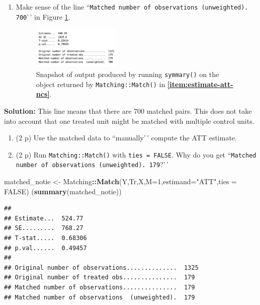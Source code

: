 \documentclass[
]{article}
\newenvironment{Shaded}{\begin{snugshade}}{\end{snugshade}}
\newcommand{\AttributeTok}[1]{\textcolor[rgb]{0.13,0.29,0.53}{#1}}
\newcommand{\ConstantTok}[1]{\textcolor[rgb]{0.56,0.35,0.01}{#1}}
\newcommand{\DecValTok}[1]{\textcolor[rgb]{0.00,0.00,0.81}{#1}}
\newcommand{\FunctionTok}[1]{\textcolor[rgb]{0.13,0.29,0.53}{\textbf{#1}}}
\newcommand{\NormalTok}[1]{#1}
\newcommand{\OtherTok}[1]{\textcolor[rgb]{0.56,0.35,0.01}{#1}}
\newcommand{\SpecialCharTok}[1]{\textcolor[rgb]{0.81,0.36,0.00}{\textbf{#1}}}
\newcommand{\StringTok}[1]{\textcolor[rgb]{0.31,0.60,0.02}{#1}}
\providecommand{\tightlist}{%
  \setlength{\itemsep}{0pt}\setlength{\parskip}{0pt}}
\begin{document}
\begin{enumerate}
\def\labelenumi{\alph{enumi}.}
\setcounter{enumi}{5}
\tightlist
\item
  Make sense of the line
  ``\texttt{Matched number of observations (unweighted). 700}'\,' in
  Figure \ref{fig:nnm_output}.

  \begin{figure}[h]
       \centering
       \captionsetup{width=.6\textwidth}
       \includegraphics[width=0.4\textwidth]{figures/q7_f.png}
       \caption{Snapshot of output produced by running \texttt{symmary()} on the object returned by \texttt{Matching::Match()} in \textbf{\ref{item:estimate-att-ncs}}.}
       \label{fig:nnm_output}
       \end{figure}
\end{enumerate}

\textbf{Solution:} This line means that there are 700 matched pairs.
This does not take into account that one treated unit might be matched
with multiple control units.

\begin{enumerate}
\def\labelenumi{\alph{enumi}.}
\setcounter{enumi}{6}
\tightlist
\item
  (2 p) Use the matched data to ``manually'\,' compute the ATT estimate.
\item
  (2 p) Run \texttt{Matching::Match()} with \texttt{ties = FALSE}. Why
  do you get
  ``\texttt{Matched number of observations (unweighted). 179}?'\,'
\end{enumerate}

\begin{Shaded}
\begin{Highlighting}[]
\NormalTok{matched\_notie }\OtherTok{\textless{}{-}}\NormalTok{ Matching}\SpecialCharTok{::}\FunctionTok{Match}\NormalTok{(Y,Tr,X,}\AttributeTok{M=}\DecValTok{1}\NormalTok{,}\AttributeTok{estimand=}\StringTok{"ATT"}\NormalTok{,}\AttributeTok{ties =} \ConstantTok{FALSE}\NormalTok{)}
\NormalTok{(}\FunctionTok{summary}\NormalTok{(matched\_notie))}
\end{Highlighting}
\end{Shaded}

\begin{verbatim}
## 
## Estimate...  524.77 
## SE.........  768.27 
## T-stat.....  0.68306 
## p.val......  0.49457 
## 
## Original number of observations..............  1325 
## Original number of treated obs...............  179 
## Matched number of observations...............  179 
## Matched number of observations  (unweighted).  179
\end{verbatim}
\end{document}
